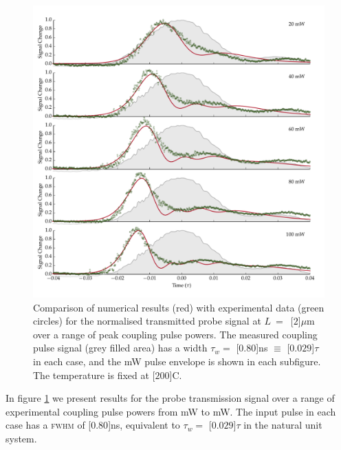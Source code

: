    \begin{figure}[p]
    \includegraphics[width=\linewidth]
      {figs/06_simultons/solve_b_multi_01_fig1.pdf}
    \caption{
    Comparison of numerical results (red) with experimental data (green circles)
    for the normalised transmitted probe signal at $L~=$~\unit[$2$]{$\mu$m} over
    a range of peak coupling pulse powers. The measured coupling pulse signal
    (grey filled area) has a width $\tau_w = $ \unit[$0.80$]{ns} $ \equiv $
    \unit[$0.029$]{$\tau$} in each case, and the \unit[100]{mW} pulse envelope
    is shown in each subfigure. The temperature is fixed at
    \unit[$200$]{\textdegree C}.
    } 
    \label{fig:exp_result_power_dep} 
    \end{figure}
    In figure \ref{fig:exp_result_power_dep} we present results for the probe
    transmission signal over a range of experimental coupling pulse powers from
    \unit[20]{mW} to \unit[100]{mW}. The input pulse in each case has a
    \textsc{fwhm} of \unit[$0.80$]{ns}, equivalent to $\tau_w = $
    \unit[$0.029$]{$\tau$} in the natural unit system.

